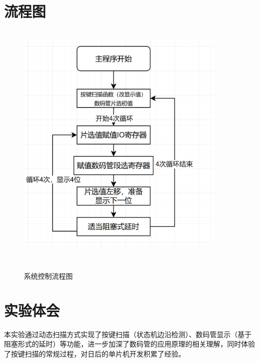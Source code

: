 \documentclass[12pt,hyperref,a4paper,UTF8]{ctexart}
\begin{document}
\section{流程图}


\begin{figure}[H] %
        \centering
        \includegraphics[width=0.9\textwidth]{figures/301.png} %
        \caption{系统控制流程图} %
        \label{fig:example} %
\end{figure}



\section{实验体会}


本实验通过动态扫描方式实现了按键扫描（状态机边沿检测）、数码管显示（基于阻塞形式的延时）等功能，进一步加深了数码管的应用原理的相关理解，同时体验了按键扫描的常规过程，对日后的单片机开发积累了经验。
\end{document}
